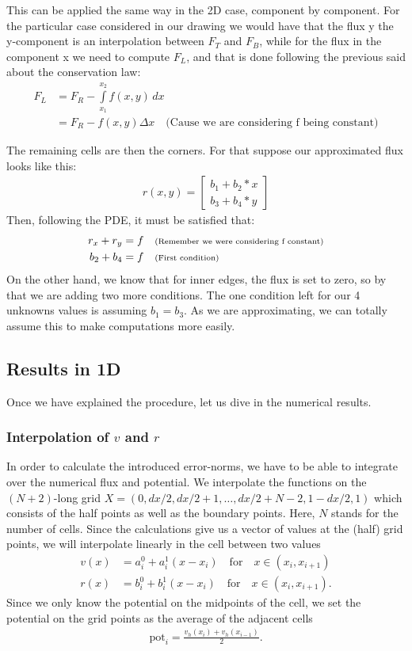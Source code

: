 \documentclass{article}
\begin{document}
	This can be applied the same way in the 2D case, component by component. For the particular case considered in our drawing we would have that the flux y the y-component is an interpolation between $F_T$ and $F_B$, while for the flux in the component x we need to compute $F_L$, and that is done following the previous said about the conservation law:
	\begin{align*}
	F_L &= F_R - \int\limits_{x_1}^{x_2} f(x,y) \,dx\ \\
	&=  F_R - f(x,y)\Delta x \quad \text{(Cause we are considering f being constant)}
	\end{align*}
	
	The remaining cells are then the corners. For that suppose our approximated flux looks like this:
	\begin{align*}
	r(x,y) = \begin{bmatrix}
	b_1+b_2*x\\
	b_3+b_4*y
	\end{bmatrix}
	\end{align*}
	Then, following the PDE, it must be satisfied that:
	\begin{align*}
	r_x + r_y &= f \quad \text{\scriptsize{(Remember we were considering f constant)}}\\
	b_2 + b_4 &= f \quad \text{\scriptsize{(First condition)}}
	\end{align*}
	On the other hand, we know that for inner edges, the flux is set to zero, so by that we are adding two more conditions. The one condition left for our 4 unknowns values is assuming $b_1 = b_3$. As we are approximating, we can totally assume this to make computations more easily. 
	
	\subsection*{Results in 1D}
	Once we have explained the procedure, let us dive in the numerical results.
	\subsubsection*{Interpolation of $v$ and $r$}
	In order to calculate the introduced error-norms, we have to be able to integrate over the numerical flux and potential. 
	We interpolate the functions on the $(N+2)$-long grid $X = (0, dx/2, dx/2 + 1, \dots, dx/2 + N-2, 1-dx/2, 1)$ which consists of the half points as well as the boundary points.
	Here, $N$ stands for the number of cells. 
	Since the calculations give us a vector of values at the (half) grid points, we will interpolate linearly in the cell between two values
	\begin{align*}
	v(x) &= a_i^0 + a_i^1(x - x_i) \quad \mathrm{for }\quad x\in (x_i, x_{i+1})\\
	r(x) &= b_i^0 + b_i^1(x - x_i) \quad \mathrm{for }\quad x\in (x_i, x_{i+1}).
	\end{align*}
	Since we only know the potential on the midpoints of the cell, we set the potential on the grid points as the average of the adjacent cells
	\begin{align}
	\mathrm{pot}_i = \frac{v_h(x_i) + v_h(x_{i-1}) }{2}.
	\end{align}
	
\end{document}
